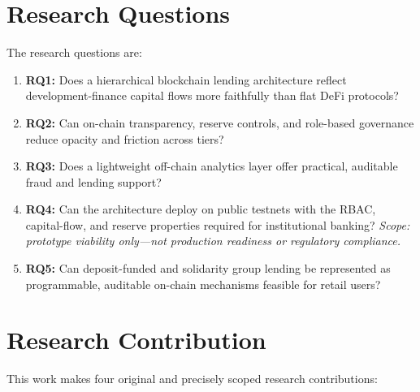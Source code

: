 \documentclass[12pt, a4paper]{report}
\begin{document}
\section{Research Questions}

The research questions are:

\begin{enumerate}[noitemsep]
\item \textbf{RQ1:} Does a hierarchical blockchain lending architecture reflect development-finance capital flows more faithfully than flat DeFi protocols?
\item \textbf{RQ2:} Can on-chain transparency, reserve controls, and role-based governance reduce opacity and friction across tiers?
\item \textbf{RQ3:} Does a lightweight off-chain analytics layer offer practical, auditable fraud and lending support?
\item \textbf{RQ4:} Can the architecture deploy on public testnets with the RBAC, capital-flow, and reserve properties required for institutional banking? \textit{Scope: prototype viability only---not production readiness or regulatory compliance.}
\item \textbf{RQ5:} Can deposit-funded and solidarity group lending be represented as programmable, auditable on-chain mechanisms feasible for retail users?
\end{enumerate}

\section{Research Contribution}
\label{sec:research-contribution}

This work makes four original and precisely scoped research contributions:
\end{document}
